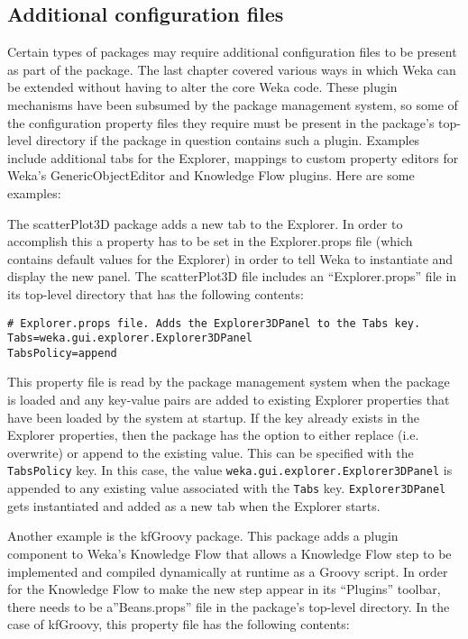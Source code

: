 \subsection{Additional configuration files}

Certain types of packages may require additional configuration files
to be present as part of the package. The last chapter covered various
ways in which Weka can be extended without having to alter the core
Weka code. These plugin mechanisms have been subsumed by the package
management system, so some of the configuration property files they
require must be present in the package's top-level directory if the
package in question contains such a plugin. Examples include
additional tabs for the Explorer, mappings to custom property editors
for Weka's GenericObjectEditor and Knowledge Flow plugins. Here are
some examples:

The scatterPlot3D package adds a new tab to the Explorer. In order to
accomplish this a property has to be set in the Explorer.props file
(which contains default values for the Explorer) in order to tell Weka
to instantiate and display the new panel. The scatterPlot3D file includes
an ``Explorer.props'' file in its top-level directory that has the following
contents:

\begin{verbatim}
# Explorer.props file. Adds the Explorer3DPanel to the Tabs key.
Tabs=weka.gui.explorer.Explorer3DPanel
TabsPolicy=append
\end{verbatim}

This property file is read by the package management system when the
package is loaded and any key-value pairs are added to existing
Explorer properties that have been loaded by the system at startup. If
the key already exists in the Explorer properties, then the package
has the option to either replace (i.e. overwrite) or append to the
existing value. This can be specified with the \texttt{TabsPolicy}
key. In this case, the value
\texttt{weka.gui.explorer.Explorer3DPanel} is appended to any existing
value associated with the \texttt{Tabs} key. \texttt{Explorer3DPanel}
gets instantiated and added as a new tab when the Explorer starts.

Another example is the kfGroovy package. This package adds a plugin
component to Weka's Knowledge Flow that allows a Knowledge Flow step
to be implemented and compiled dynamically at runtime as a Groovy
script. In order for the Knowledge Flow to make the new step appear
in its ``Plugins'' toolbar, there needs to be a''Beans.props'' file
in the package's top-level directory. In the case of kfGroovy, this
property file has the following contents:

